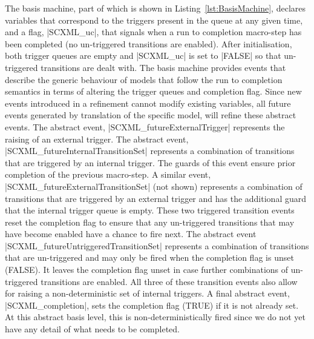 The basis machine, part of which is shown in Listing~\ref{lst:BasisMachine}, declares variables that correspond to the triggers present in the queue at any given time, and a flag, |SCXML_uc|, that signals when a run to completion macro-step has been completed (no un-triggered transitions are enabled). 
After initialisation, both trigger queues are empty and |SCXML_uc| is set to |FALSE| so that un-triggered transitions are dealt with. 
The basis machine provides events that describe the generic behaviour of models that follow the run to completion semantics in terms of altering the trigger queues and completion flag.
Since new events introduced in a refinement cannot modify existing variables, all future events generated by translation of the specific \SCXML model, will refine these abstract events.
The abstract event, |SCXML_futureExternalTrigger| represents the raising of an external trigger.    
The abstract event, |SCXML_futureInternalTransitionSet| represents a combination of transitions that are triggered by an internal trigger. 
The guards of this event ensure prior completion of the previous macro-step. 
A similar event, |SCXML_futureExternalTransitionSet| (not shown) represents a combination of transitions that are triggered by an external trigger and has the additional guard that the internal trigger queue is empty.
These two triggered transition events reset the completion flag to ensure that any un-triggered transitions that may have become enabled have a chance to fire next.
The abstract event |SCXML_futureUntriggeredTransitionSet| represents a combination of transitions that are un-triggered and may only be fired when the completion flag is unset (FALSE).
It leaves the completion flag unset in case further combinations of un-triggered transitions are enabled.
All three of these transition events also allow for raising a non-deterministic set of internal triggers.
A final abstract event, |SCXML_completion|, sets the completion flag (TRUE) if it is not already set. At this abstract basis level, this is non-deterministically fired since we do not yet have any detail of what needs to be completed.

